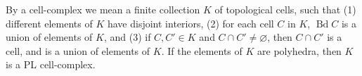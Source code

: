 By a cell-complex we mean a finite collection $K$ of topological cells, such that (1) different elements of $K$ have disjoint interiors, (2) for each cell $C$ in $K$, $\operatorname{Bd} C$ is a union of elements of $K$, and (3) if $C, C' \in K$ and $C \cap C' \neq \varnothing$, then $C \cap C'$ is a cell, and is a union of elements of $K$. If the elements of $K$ are polyhedra, then $K$ is a PL cell-complex.
